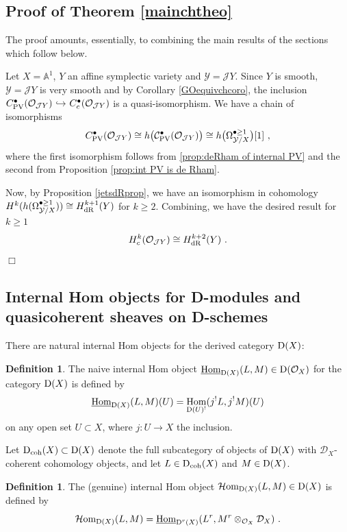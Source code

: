 \documentclass[11pt]{amsart}
\numberwithin{equation}{section}
\theoremstyle{definition}
\newtheorem{defn}[theo]{Definition}
\newcommand{\mc}{\mathcal}
\DeclareMathOperator{\Hom}{Hom}
\newcommand{\into}{{\ \hookrightarrow\ }}
\newcommand{\dR}{{\textup{dR}}}
\newcommand{\Homi}{{\mc H\textup{om}}}
\newcommand{\coh}{{\textup{coh}}}
\newcommand{\CC}{{\textup{CC}}}
\newcommand{\PV}{{{\textup{PV}}}}
\newcommand{\0}{{\textbf{0}}}
\newcommand{\Dd}{{\textup{D}}}
\newcommand{\Homii}{{\underline{\textup{Hom}}}}
\def\IA{\mathbb{A}}
\def\CC{{\mc C}}
\def\JJ{{\mc J}}
\def\OO{{\mc O}}
\def\YY{{\mc Y}}
\begin{document}
\subsection{Proof of Theorem \ref{mainchtheo}}\label{ssec:proof of mainchtheo}

The proof amounts, essentially, to combining the main results of the sections which follow below.

Let $X = \IA^1$, $Y$ an affine symplectic variety and $\YY = \JJ Y$. Since $Y$ is smooth, $\YY=\JJ Y$ is very smooth and by Corollary \ref{GOequivchcoro}, the inclusion $C_{\PV}^\bullet(\OO_{\JJ Y})\into C_c^\bullet(\OO_{\JJ Y})$ is a quasi-isomorphism. We have a chain of isomorphisms
\[
C^\bullet_{\PV}(\OO_{\JJ Y}) \cong h\big(\CC_{\PV}^\bullet(\OO_{\JJ Y})\big) \cong h\big(\Omega^{\bullet\ge1}_{\mc Y/X}\big)[1]~,
\]
where the first isomorphism follows from \ref{prop:deRham of internal PV} and the second from Proposition \ref{prop:int PV is de Rham}.

Now, by Proposition \ref{jetsdRprop}, we have an isomorphism in cohomology $H^k(h(\Omega^{\bullet\ge1}_{\mc Y/X}))\cong H^{k+1}_{\dR}(Y) $ for $k\ge 2$. Combining, we have the desired result for $k\ge 1$
\[
H^k_c(\OO_{\JJ Y}) \cong H^{k+2}_\dR(Y)~.
\]
\hfill $\Box$

\subsection{Internal Hom objects for D-modules and quasicoherent sheaves on D-schemes}\label{inthomsec}

There are natural internal Hom objects for the derived category $\Dd(X)$:
\begin{defn}
	The naive internal Hom object $ \Homii_{\Dd(X)}(L,M) \in\Dd(\mc O_X)$ for the category $\Dd(X)$ is defined by
	\[  \Homii_{\Dd(X)}(L,M)(U) = \Hom_{\Dd(U)^!}(j^!L,j^!M)(U) \]
	on any open set $U\subset X$, where $j:U\to X$ the inclusion.
\end{defn}

Let $\Dd_\coh(X) \subset \Dd(X)$ denote the full subcategory of objects of $\Dd(X)$ with  $\mc D_X$-coherent cohomology objects, and let $L\in \Dd_\coh(X)$ and $M\in \Dd(X)$.

\begin{defn}  The (genuine) internal Hom object $\Homi_{\Dd(X)}(L,M) \in \Dd(X)$ is defined by 
	\[\Homi_{\Dd(X)}(L,M)  = \Homii_{\Dd^r(X)}(L^r, M^r \otimes_{\mc O_X} \mc D_X ) \ . \]
\end{defn}
\end{document}
